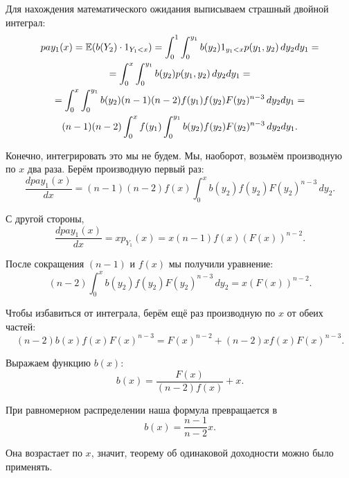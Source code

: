 \begin{myex}
Для нахождения математического ожидания выписываем страшный двойной интеграл:
\begin{multline}
pay_{1}(x)=\operatorname{\mathbb{E}}(b(Y_{2})\cdot 1_{Y_{1}<x})=\int_{0}^{1}\int_{0}^{y_{1}} b(y_{2})1_{y_{1}<x} p(y_{1},y_{2}) \, dy_{2}dy_{1}=\\
=\int_{0}^{x}\int_{0}^{y_{1}} b(y_{2})p(y_{1},y_{2}) \, dy_{2}dy_{1}=\\
=\int_{0}^{x}\int_{0}^{y_{1}} b(y_{2}) (n-1)(n-2)f(y_{1})f(y_{2})F(y_{2})^{n-3} \, dy_{2}dy_{1}=\\
(n-1)(n-2)\int_{0}^{x}f(y_{1})\int_{0}^{y_{1}} b(y_{2}) f(y_{2})F(y_{2})^{n-3} \, dy_{2}dy_{1}.
\end{multline}

Конечно, интегрировать это мы не будем. Мы, наоборот, возьмём производную по $x$ два раза. Берём производную первый раз:
\begin{equation}
\frac{dpay_{1}(x)}{dx}=(n-1)(n-2)f(x)\int_{0}^{x} b(y_{2}) f(y_{2})F(y_{2})^{n-3} \, dy_{2}.
\end{equation}

С другой стороны,
\begin{equation}
\frac{dpay_{1}(x)}{dx}=xp_{Y_{1}}(x)=x(n-1)f(x)(F(x))^{n-2}.
\end{equation}

После сокращения $ (n-1) $ и $ f(x) $ мы получили уравнение:
\begin{equation}
(n-2)\int_{0}^{x} b(y_{2}) f(y_{2})F(y_{2})^{n-3} \, dy_{2}=x(F(x))^{n-2}.
\end{equation}

Чтобы избавиться от интеграла, берём ещё раз производную по $ x $ от обеих частей:
\begin{equation}
(n-2) b(x) f(x)F(x)^{n-3}=F(x)^{n-2}+(n-2)xf(x)F(x)^{n-3}.
\end{equation}

Выражаем функцию $ b(x) $:
\begin{equation}
b(x)=\frac{F(x)}{(n-2)f(x)}+x.
\end{equation}

При равномерном распределении наша формула превращается в
\begin{equation}
b(x)=\frac{n-1}{n-2}x.
\end{equation}

Она возрастает по $ x $, значит, теорему об одинаковой доходности можно было применять.
\end{myex}


